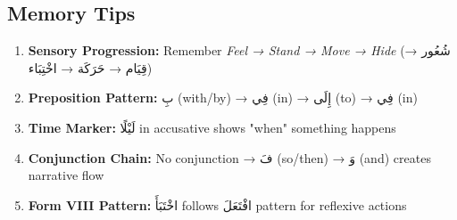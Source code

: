 \documentclass[letter,12pt]{article}
\begin{document}
\subsection{Memory Tips}
\begin{enumerate}
\item \textbf{Sensory Progression:} Remember \textit{Feel → Stand → Move → Hide} (\textarabic{شُعُور} → \textarabic{قِيَام} → \textarabic{حَرَكَة} → \textarabic{اخْتِبَاء})
\item \textbf{Preposition Pattern:} \textarabic{بِ} (with/by) → \textarabic{فِي} (in) → \textarabic{إِلَى} (to) → \textarabic{فِي} (in)
\item \textbf{Time Marker:} \textarabic{لَيْلًا} in accusative shows "when" something happens
\item \textbf{Conjunction Chain:} No conjunction → \textarabic{فَ} (so/then) → \textarabic{وَ} (and) creates narrative flow
\item \textbf{Form VIII Pattern:} \textarabic{اخْتَبَأَ} follows \textarabic{افْتَعَلَ} pattern for reflexive actions
\end{enumerate}
\end{document}
